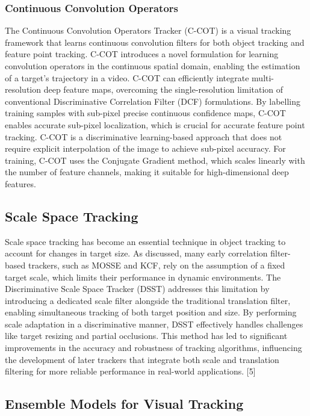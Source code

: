 \documentclass{article}
\begin{document}
\subsubsection{Continuous Convolution Operators}

The Continuous Convolution Operators Tracker (C-COT) is a visual tracking framework that learns continuous convolution filters for both object tracking and feature point tracking. C-COT introduces a novel formulation for learning convolution operators in the continuous spatial domain, enabling the estimation of a target's trajectory in a video. C-COT can efficiently integrate multi-resolution deep feature maps, overcoming the single-resolution limitation of conventional Discriminative Correlation Filter (DCF) formulations. By labelling training samples with sub-pixel precise continuous confidence maps, C-COT enables accurate sub-pixel localization, which is crucial for accurate feature point tracking. C-COT is a discriminative learning-based approach that does not require explicit interpolation of the image to achieve sub-pixel accuracy. For training, C-COT uses the Conjugate Gradient method, which scales linearly with the number of feature channels, making it suitable for high-dimensional deep features.

\subsection{Scale Space Tracking}

Scale space tracking has become an essential technique in object tracking to account for changes in target size. As discussed, many early correlation filter-based trackers, such as MOSSE and KCF, rely on the assumption of a fixed target scale, which limits their performance in dynamic environments. The Discriminative Scale Space Tracker (DSST) addresses this limitation by introducing a dedicated scale filter alongside the traditional translation filter, enabling simultaneous tracking of both target position and size. By performing scale adaptation in a discriminative manner, DSST effectively handles challenges like target resizing and partial occlusions. This method has led to significant improvements in the accuracy and robustness of tracking algorithms, influencing the development of later trackers that integrate both scale and translation filtering for more reliable performance in real-world applications. [5]

\subsection{Ensemble Models for Visual Tracking}
\end{document}
